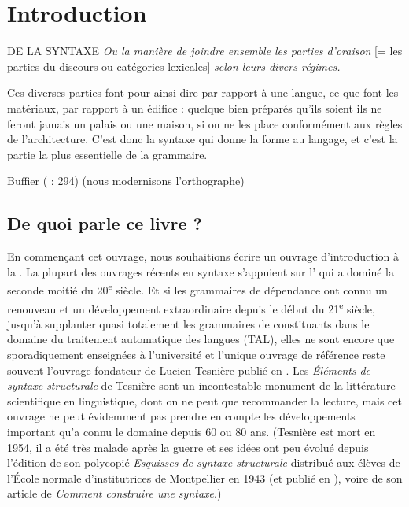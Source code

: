 \chapter{Introduction}

\epigraph{DE LA SYNTAXE \textit{Ou la manière de joindre ensemble les parties d’oraison} [= les parties du discours ou catégories lexicales] \textit{selon leurs divers régimes.}

Ces diverses parties font pour ainsi dire par rapport à une langue, ce que font les matériaux, par rapport à un édifice : quelque bien préparés qu’ils soient ils ne feront jamais un palais ou une maison, si on ne les place conformément aux règles de l’architecture. C’est donc la syntaxe qui donne la forme au langage, et c’est la partie la plus essentielle de la grammaire.}{Buffier (\citeyear{buffier1709grammaire} : 294) (nous modernisons l’orthographe)}

\section{De quoi parle ce livre ?}\label{sec:0.0.0}

En commençant cet ouvrage, nous souhaitions écrire un ouvrage d’introduction à la . La plupart des ouvrages récents en syntaxe s’appuient sur l’ qui a dominé la seconde moitié du 20\textsuperscript{e} siècle. Et si les grammaires de dépendance ont connu un renouveau et un développement extraordinaire depuis le début du 21\textsuperscript{e} siècle, jusqu’à supplanter quasi totalement les grammaires de constituants dans le domaine du traitement automatique des langues (TAL), elles ne sont encore que sporadiquement enseignées à l’université et l’unique ouvrage de référence reste souvent l’ouvrage fondateur de Lucien Tesnière publié en \citeyear{tesniere1959elements}. Les \textit{Éléments} \textit{de syntaxe structurale} de Tesnière sont un incontestable monument de la littérature scientifique en linguistique, dont on ne peut que recommander la lecture, mais cet ouvrage ne peut évidemment pas prendre en compte les développements important qu’a connu le domaine depuis 60 ou 80 ans. (Tesnière est mort en 1954, il a été très malade après la guerre et ses idées ont peu évolué depuis l’édition de son polycopié \textit{Esquisses de syntaxe structurale} distribué aux élèves de l’École normale d’institutrices de Montpellier en 1943 (et publié en \citeyear{tesniere1953esquisse}), voire de son article de \citeyear{tesniere1934comment} \textit{Comment construire une syntaxe}.)

